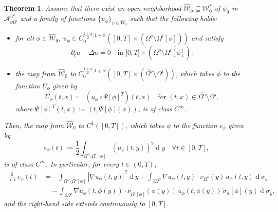 \documentclass[11pt,reqno,a4paper]{amsart}
\theoremstyle{plain}
\newtheorem{theorem}{Theorem}[section]
\theoremstyle{definition}
\renewcommand{\d}[1]{\ensuremath{\operatorname{d}\!{#1}}}
\begin{document}
\begin{theorem}\label{thm energy dependence abstract}
    Assume that there exist an open neighborhood $\widehat{\mathcal{W}}_0 \subseteq \mathcal{W}^\ast_0$ of $\phi_0$ in $\mathcal{A}^{\Omega^o}_{\partial\Omega^i}$ and a family of functions $\{ u_\phi \}_{\phi \in \widehat{\mathcal{W}}_0}$ such that the following holds:
    \begin{itemize}
        \item[(i)] for all $\phi \in \widehat{\mathcal{W}}_0$, $u_\phi \in C_{0}^{\frac{1+\alpha}{2}; 1+\alpha}([0,T] \times (\overline{\Omega^o} \setminus \Omega^i[\phi] ))$ and satisfy
        \begin{equation}\label{princeqpertu family}
            \partial_t u - \Delta u = 0  \quad \text{in } ]0,T] \times (\Omega^o \setminus \overline{\Omega^i[\phi]});
        \end{equation}

        \item[(ii)] the map from $\widehat{\mathcal{W}}_0$ to $C_{0}^{\frac{1+\alpha}{2}; 1+\alpha}([0,T] \times (\overline{\Omega^o} \setminus \Omega^i))$, which takes $\phi$ to the function $U_\phi$ given by 
        \begin{equation}\label{eq: U_phi := u_phi Psi phi}
        U_\phi(t,x):= \left( u_\phi \circ \Psi[\phi]^T \right) (t,x) \quad \text{for } (t,x) \in \overline{\Omega^o} \setminus \Omega^i,
        \end{equation}
        where $\Psi[\phi]^T(t,x):=(t,\Psi[\phi](x))$, is of class $C^\infty$.
    \end{itemize}
    Then, the map from $\widehat{\mathcal{W}}_0$ to $C^1([0,T])$, which takes $\phi$ to the function $e_\phi$ given by
    \begin{equation*}
    e_\phi(t) := \frac{1}{2} \int_{\Omega^o \setminus \overline{\Omega^i[\phi]}} (u_\phi(t,y))^2 \d y \quad \forall t \in [0,T],
    \end{equation*}
    is of class $C^\infty$. In particular, for every $t\in(0,T)$,
    \begin{equation}\label{eq: derivative of e general}
    \begin{aligned}
        \frac{\d{}}{\d t}e_\phi(t) &= - \int_{\Omega^o \setminus \overline{\Omega^i[\phi]}} |\nabla u_\phi(t,y)|^2 \d y + \int_{\partial\Omega^o} 
        \nabla u_\phi(t,y)\cdot \nu_{\Omega^o}(y) \, u_{\phi}(t,y) \d \sigma_y 
        \\
        & \quad
        - \int_{\partial\Omega^i} \nabla u_\phi(t,\phi(y))\cdot \nu_{\Omega^i[\phi]}(\phi(y)) \, u_\phi(t,\phi(y)) \, \tilde\sigma_n[\phi](y) \d\sigma_y,
    \end{aligned}
    \end{equation}
    and the right-hand side extends continuously to $[0,T]$.
\end{theorem}
\end{document}
